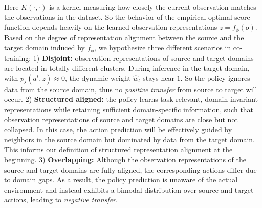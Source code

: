 Here $K(\cdot, \cdot)$ is a kernel measuring how closely the current observation matches the observations in the dataset. So the behavior of the empirical optimal score function depends heavily on the learned observation representations $z = f_\phi(o)$. Based on the degree of representation alignment between the source and the target domain induced by $f_\phi$, we hypothesize three different scenarios in co-training: 1) \textbf{Disjoint:} observation representations of source and target domains are located in totally different clusters. During inference in the target domain, with $p_s(a^t,z)\approx 0$, the dynamic weight $\hat{w}_t$ stays near $1$. So the policy ignores data from the source domain, thus no \textit{positive transfer} from source to target will occur. 2) \textbf{Structured aligned:} the policy learns task-relevant, domain-invariant representations while retaining sufficient domain-specific information, such that observation representations of source and target domains are close but not collapsed. In this case, the action prediction will be effectively guided by neighbors in the source domain but dominated by data from the target domain. This informs our definition of structured representation alignment at the beginning. 3) \textbf{Overlapping:} Although the observation representations of the source and target domains are fully aligned, the corresponding actions differ due to domain gaps. As a result, the policy prediction is unaware of the actual environment and instead exhibits a bimodal distribution over source and target actions, leading to \textit{negative transfer}.



